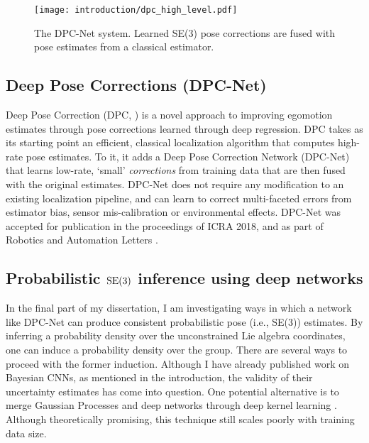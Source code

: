\begin{figure}
\begin{center}
		\texttt{[image: introduction/dpc\_high\_level.pdf]}
		\caption{The DPC-Net system. Learned SE(3) pose corrections are fused with pose estimates from a classical estimator.}
  	\label{fig:dpc_system}
\end{center}

\end{figure}


\subsection{Deep Pose Corrections (DPC-Net)}
Deep Pose Correction (DPC, ) is a novel approach to improving egomotion estimates through pose corrections learned through deep regression. DPC takes as its starting point an efficient, classical localization algorithm that computes high-rate pose estimates. To it, it adds a Deep Pose Correction Network (DPC-Net) that learns low-rate, `small' \textit{corrections} from training data that are then fused with the original estimates. DPC-Net does not require any modification to an existing localization pipeline, and can learn to correct multi-faceted errors from estimator bias, sensor mis-calibration or environmental effects. DPC-Net was accepted for publication in the proceedings of ICRA 2018, and as part of Robotics and Automation Letters \citep{2018_Peretroukhin_Deep}.

\subsection{Probabilistic $\mathrm{SE}(3)$ inference using deep networks}

In the final part of my dissertation, I am investigating ways in which a network like DPC-Net can produce consistent probabilistic pose (i.e., SE(3)) estimates. By inferring a probability density over the unconstrained Lie algebra coordinates, one can induce a probability density over the group. There are several ways to proceed with the former induction.  Although I have already published work on Bayesian CNNs, as mentioned in the introduction, the validity of their uncertainty estimates has come into question. One potential alternative is to merge Gaussian Processes and deep networks through deep kernel learning \citep{Wilson2016-vy}. Although theoretically promising, this technique still scales poorly with training data size.

